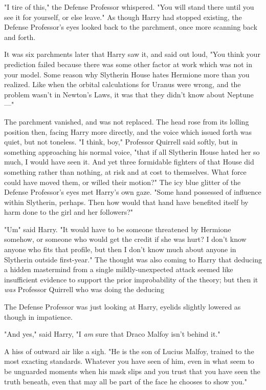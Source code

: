 "I tire of this," the Defense Professor whispered. "You will stand there until
you see it for yourself, or else leave." As though Harry had stopped existing,
the Defense Professor's eyes looked back to the parchment, once more scanning
back and forth.

It was six parchments later that Harry saw it, and said out loud, "You think
your prediction failed because there was some other factor at work which was
not in your model. Some reason why Slytherin House hates Hermione more than you
realized. Like when the orbital calculations for Uranus were wrong, and the
problem wasn't in Newton's Laws, it was that they didn't know about Neptune\mbox{---}"

The parchment vanished, and was not replaced. The head rose from its lolling
position then, facing Harry more directly, and the voice which issued forth was
quiet, but not toneless. "I think, boy," Professor Quirrell said softly, but in
something approaching his normal voice, "that if all Slytherin House hated her
so much, I would have seen it. And yet three formidable fighters of that House
did something rather than nothing, at risk and at cost to themselves. What
force could have moved them, or willed their motion?" The icy blue glitter of
the Defense Professor's eyes met Harry's own gaze. "Some hand possessed of
influence within Slytherin, perhaps. Then how would that hand have benefited
itself by harm done to the girl and her followers?"

"Um{\el}" said Harry. "It would have to be someone threatened by Hermione
somehow, or someone who would get the credit if she was hurt? I don't know
anyone who fits that profile, but then I don't know much about anyone in
Slytherin outside first-year." The thought was also coming to Harry that
deducing a hidden mastermind from a single mildly-unexpected attack seemed like
insufficient evidence to support the prior improbability of the theory; but
then it \emph{was} Professor Quirrell who was doing the deducing{\el}

The Defense Professor was just looking at Harry, eyelids slightly lowered as
though in impatience.

"And yes," said Harry, "I \emph{am} sure that Draco Malfoy isn't behind it."

A hiss of outward air like a sigh. "He is the son of Lucius Malfoy, trained to
the most exacting standards. Whatever you have seen of him, even in what seem
to be unguarded moments when his mask slips and you trust that you have seen
the truth beneath, even that may all be part of the face he chooses to show
you."

